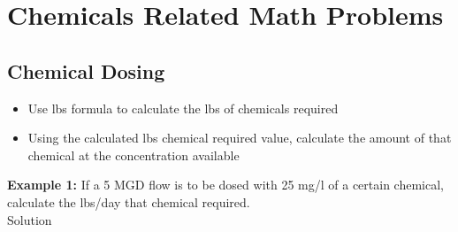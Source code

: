 %
%
%
%
%
%
%

\section{Chemicals Related Math Problems}
\subsection{Chemical Dosing}

\begin{itemize}
\item Use lbs formula to calculate the lbs of chemicals required\\
\item Using the calculated lbs chemical required value, calculate the amount of that chemical at the concentration available
\end{itemize}

\textbf{Example 1:} If a 5 MGD flow is to be dosed with 25 mg/l of a certain chemical, calculate the lbs/day that chemical required.\\

Solution\\

